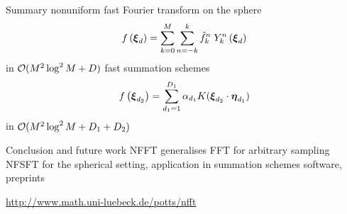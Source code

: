 \newpage
\hypertarget{summary}{}
{\color{blue} Summary}
\vfill
nonuniform fast Fourier transform on the sphere
\begin{equation*}
  f\left(\mbox{\boldmath $\xi$}_d\right)=\sum\limits_{k=0}^{M} \sum\limits_{n=-k}^{k} {\hat
  f}_k^n \; Y_k^n\left(\mbox{\boldmath $\xi$}_d\right)
\end{equation*}
in ${\cal O}(M^2 \log^2 M + D)$
\vfill
fast summation schemes
\begin{equation*}
  f\left(\mbox{\boldmath $\xi$}_{d_2}\right) = \sum_{d_1=1}^{D_1} \alpha_{d_1} K(\mbox{\boldmath $\xi$}_{d_2}\cdot \mbox{\boldmath $\eta$}_{d_1})
\end{equation*}
in ${\cal O}( M^2 \log^2 M + D_1+D_2)$
\vfill

\newpage
{\color{blue} Conclusion and future work}
\vfill
NFFT generalises FFT for arbitrary sampling
\vfill
NFSFT for the spherical setting, application in summation schemes
\vfill
software, preprints
\begin{center}
 \href{http://www.math.uni-luebeck.de/potts/nfft}{\exco http://www.math.uni-luebeck.de/potts/nfft}
\end{center}
 \vfill


